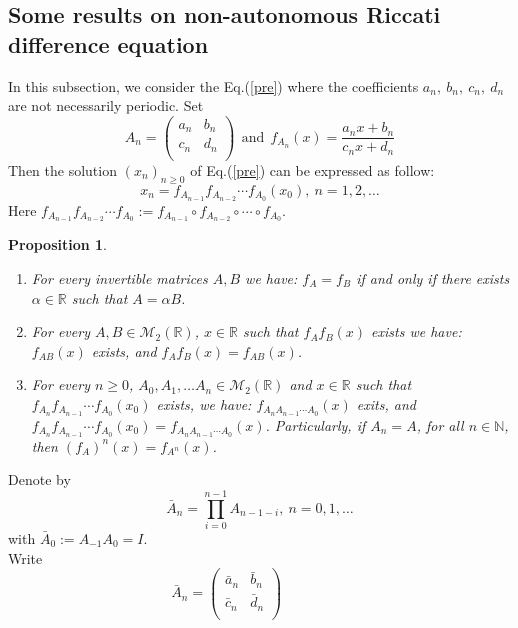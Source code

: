 \documentclass[11pt]{amsart}
\newtheorem{prop}[thm]{Proposition}
\theoremstyle{definition}
\theoremstyle{remark}
\theoremstyle{example}
\numberwithin{equation}{section}
\begin{document}
\subsection{Some results on non-autonomous Riccati difference equation}
\noindent
In this subsection, we consider the Eq.(\ref{pre}) where the coefficients $a_n, \ b_n, \ c_n, \ d_n$ are not
necessarily periodic.
Set
$$A_n=\left(\begin{array}{cc}
a_n & b_n \\
c_n & d_n \\
\end{array}\right) \ \ \text{and} \ \ f_{A_n}(x)=\displaystyle{\frac{a_nx+b_n}{c_nx+d_n}}$$
Then the solution $(x_n)_{n\geq0}$ of Eq.(\ref{pre}) can be expressed as follow:
$$x_n=f_{A_{n-1}}f_{A_{n-2}}\cdots f_{A_0}(x_0), \ n=1,2,\ldots$$
Here $f_{A_{n-1}}f_{A_{n-2}}\cdots f_{A_0}:=f_{A_{n-1}}\circ f_{A_{n-2}}\circ\cdots \circ f_{A_0}$.
\medskip
\begin{prop}\rm{
\noindent
\begin{enumerate}[leftmargin=*]
\item For every invertible matrices $A,B$ we have: $f_A=f_B$ if and only if there exists $\alpha\in\mathbb{R}$ such that $A=\alpha B$.
\item For every $A,B\in\mathcal{M}_2(\mathbb{R})$, $x\in\mathbb{R}$ such that $f_Af_B(x)$ exists we have: $f_{AB}(x)$ exists, and $f_Af_B(x)=f_{AB}(x)$.
\item For every $n\geq0$, $A_0,A_1,\ldots A_n\in\mathcal{M}_2(\mathbb{R})$ and $x\in\mathbb{R}$ such that\\ $f_{A_n}f_{A_{n-1}}\cdots f_{A_0}(x_0)$
  exists, we have: $f_{A_nA_{n-1}\cdots A_0}(x)$ exits, and\\ $f_{A_n}f_{A_{n-1}}\cdots f_{A_0}(x_0)=f_{A_nA_{n-1}\cdots A_0}(x)$. Particularly, if $A_n=A$, for all $n \in \mathbb{N}$, then $(f_A)^n(x)=f_{A^n}(x)$.
\end{enumerate}}
\end{prop}
\medskip

Denote by $$\bar{A}_n=\prod\limits_{i=0}^{n-1}A_{n-1-i}, \ n=0,1,\ldots$$ with $\bar{A}_0:=A_{-1}A_0=I$.\\
Write
$$\bar{A}_n=\left(
                   \begin{array}{cc}
                     \bar{a}_n & \bar{b}_n\\
                     \bar{c}_n & \bar{d}_n \\
                   \end{array}
                 \right)\hspace{2cm}$$
\vspace{1mm}
\end{document}
